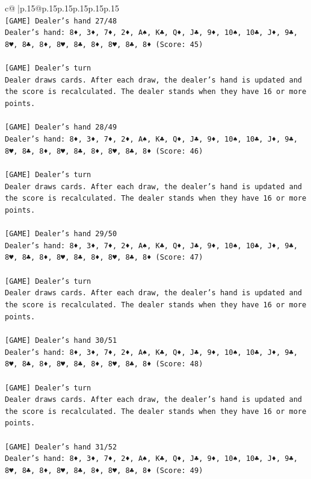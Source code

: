 \documentclass{article}
\begin{document}
{\begin{supertabular}{c@{$\;$}|p{.15\linewidth}@{}p{.15\linewidth}p{.15\linewidth}p{.15\linewidth}p{.15\linewidth}p{.15\linewidth}}
{{{\\ 
\texttt{{[}GAME{]} Dealer's hand 27/48} \\
\texttt{Dealer's hand: 8♦, 3♦, 7♦, 2♦, A♠, K♣, Q♦, J♣, 9♦, 10♠, 10♣, J♦, 9♣, 8♥, 8♣, 8♦, 8♥, 8♣, 8♦, 8♥, 8♣, 8♦ (Score: 45)} \\
\\ 
\texttt{{[}GAME{]} Dealer's turn} \\
\texttt{Dealer draws cards. After each draw, the dealer's hand is updated and the score is recalculated. The dealer stands when they have 16 or more points.} \\
\\ 
\texttt{{[}GAME{]} Dealer's hand 28/49} \\
\texttt{Dealer's hand: 8♦, 3♦, 7♦, 2♦, A♠, K♣, Q♦, J♣, 9♦, 10♠, 10♣, J♦, 9♣, 8♥, 8♣, 8♦, 8♥, 8♣, 8♦, 8♥, 8♣, 8♦ (Score: 46)} \\
\\ 
\texttt{{[}GAME{]} Dealer's turn} \\
\texttt{Dealer draws cards. After each draw, the dealer's hand is updated and the score is recalculated. The dealer stands when they have 16 or more points.} \\
\\ 
\texttt{{[}GAME{]} Dealer's hand 29/50} \\
\texttt{Dealer's hand: 8♦, 3♦, 7♦, 2♦, A♠, K♣, Q♦, J♣, 9♦, 10♠, 10♣, J♦, 9♣, 8♥, 8♣, 8♦, 8♥, 8♣, 8♦, 8♥, 8♣, 8♦ (Score: 47)} \\
\\ 
\texttt{{[}GAME{]} Dealer's turn} \\
\texttt{Dealer draws cards. After each draw, the dealer's hand is updated and the score is recalculated. The dealer stands when they have 16 or more points.} \\
\\ 
\texttt{{[}GAME{]} Dealer's hand 30/51} \\
\texttt{Dealer's hand: 8♦, 3♦, 7♦, 2♦, A♠, K♣, Q♦, J♣, 9♦, 10♠, 10♣, J♦, 9♣, 8♥, 8♣, 8♦, 8♥, 8♣, 8♦, 8♥, 8♣, 8♦ (Score: 48)} \\
\\ 
\texttt{{[}GAME{]} Dealer's turn} \\
\texttt{Dealer draws cards. After each draw, the dealer's hand is updated and the score is recalculated. The dealer stands when they have 16 or more points.} \\
\\ 
\texttt{{[}GAME{]} Dealer's hand 31/52} \\
\texttt{Dealer's hand: 8♦, 3♦, 7♦, 2♦, A♠, K♣, Q♦, J♣, 9♦, 10♠, 10♣, J♦, 9♣, 8♥, 8♣, 8♦, 8♥, 8♣, 8♦, 8♥, 8♣, 8♦ (Score: 49)} \\
}}}
\end{supertabular}}
\end{document}
